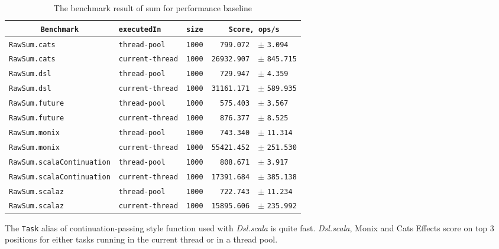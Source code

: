 \begin{table}[htbp]
  \begin{tabular}{l|l|l|rl}
   \multicolumn{1}{c|}{\texttt{Benchmark}} & \texttt{executedIn} & \texttt{size} & \multicolumn{2}{c}{\texttt{Score, ops/s}} \\
  \hline
  \texttt{RawSum.cats} & \texttt{thread-pool} & \texttt{1000} & \texttt{799.072} & \scriptsize $\pm$ \texttt{3.094}  \\
  \texttt{RawSum.cats} & \texttt{current-thread} & \texttt{1000} & \texttt{26932.907} & \scriptsize $\pm$ \texttt{845.715}  \\
  \texttt{RawSum.dsl} & \texttt{thread-pool} & \texttt{1000} & \texttt{729.947} & \scriptsize $\pm$ \texttt{4.359}  \\
  \texttt{RawSum.dsl} & \texttt{current-thread} & \texttt{1000} & \texttt{31161.171} & \scriptsize $\pm$ \texttt{589.935}  \\
  \texttt{RawSum.future} & \texttt{thread-pool} & \texttt{1000} & \texttt{575.403} & \scriptsize $\pm$ \texttt{3.567}  \\
  \texttt{RawSum.future} & \texttt{current-thread} & \texttt{1000} & \texttt{876.377} & \scriptsize $\pm$ \texttt{8.525}  \\
  \texttt{RawSum.monix} & \texttt{thread-pool} & \texttt{1000} & \texttt{743.340} & \scriptsize $\pm$ \texttt{11.314}  \\
  \texttt{RawSum.monix} & \texttt{current-thread} & \texttt{1000} & \texttt{55421.452} & \scriptsize $\pm$ \texttt{251.530}  \\
  \texttt{RawSum.scalaContinuation} & \texttt{thread-pool} & \texttt{1000} & \texttt{808.671} & \scriptsize $\pm$ \texttt{3.917}  \\
  \texttt{RawSum.scalaContinuation} & \texttt{current-thread} & \texttt{1000} & \texttt{17391.684} & \scriptsize $\pm$ \texttt{385.138}  \\
  \texttt{RawSum.scalaz} & \texttt{thread-pool} & \texttt{1000} & \texttt{722.743} & \scriptsize $\pm$ \texttt{11.234}  \\
  \texttt{RawSum.scalaz} & \texttt{current-thread} & \texttt{1000} & \texttt{15895.606} & \scriptsize $\pm$ \texttt{235.992}  \\
  \end{tabular}
  \caption{The benchmark result of sum for performance baseline}
  \label{RawSum}
\end{table}

The \lstinline{Task} alias of continuation-passing style function used with \textit{Dsl.scala} is quite fast. \textit{Dsl.scala}, Monix and Cats Effects score on top 3 positions for either tasks running in the current thread or in a thread pool.

